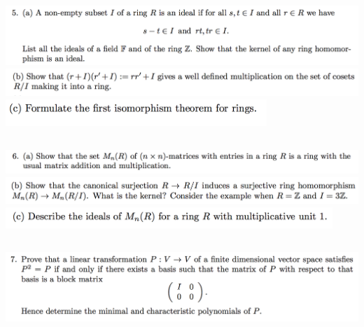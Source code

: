 \documentclass[12pt]{article}
\begin{document}
\subsection*{} %
\includegraphics[width=400pt]{img/linear-algebra-a0-1-5-a.png}\\
\includegraphics[width=400pt]{img/linear-algebra-a0-1-5-b.png}\\
\includegraphics[width=280pt]{img/linear-algebra-a0-1-5-c.png}\\
\begin{mdframed}
\end{mdframed}

\subsection*{} %
\includegraphics[width=400pt]{img/linear-algebra-a0-1-6-a.png}\\
\includegraphics[width=400pt]{img/linear-algebra-a0-1-6-b.png}\\
\includegraphics[width=350pt]{img/linear-algebra-a0-1-6-c.png}\\
\begin{mdframed}
\end{mdframed}

\subsection*{} %
\includegraphics[width=400pt]{img/linear-algebra-a0-1-7.png}\\
\begin{mdframed}
\end{mdframed}
\end{document}
